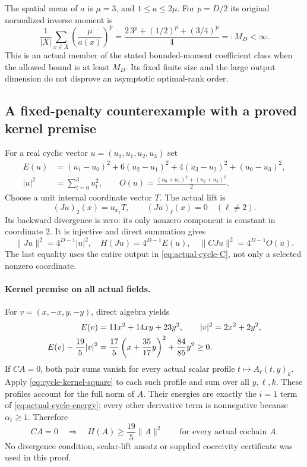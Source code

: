 The spatial mean of $a$ is $\mu=3$, and $1\leq a\leq2\mu$.
For $p=D/2$ its original normalized inverse moment is
\begin{equation}\label{eq:actual-cycle-moment}
 \frac1{|X|}\sum_{x\in X}\left(\frac{\mu}{a(x)}\right)^p
   =\frac{2\,3^p+(1/2)^p+(3/4)^p}{4}=:M_D<\infty.
\end{equation}
This is an actual member of the stated bounded-moment coefficient class
when the allowed bound is at least $M_D$. Its fixed finite size and the
large output dimension do not disprove an asymptotic optimal-rank order.

\subsection{A fixed-penalty counterexample with a proved kernel premise}
For a real cyclic vector $u=(u_0,u_1,u_2,u_3)$ set
\begin{align*}
 E(u)&=(u_1-u_0)^2+6(u_2-u_1)^2+4(u_3-u_2)^2+(u_0-u_3)^2,\\
 |u|^2&=\sum_{t=0}^3u_t^2,\qquad
 O(u)=\frac{(u_0+u_1)^2+(u_2+u_3)^2}{2}.
\end{align*}
Choose a unit internal coordinate vector $T$. The actual lift is
\[
 (Ju)_2(x)=u_{x_1}T,\qquad (Ju)_\ell(x)=0\quad(\ell\ne2).
\]
Its backward divergence is zero: its only nonzero component is constant
in coordinate $2$. It is injective and direct summation gives
\begin{equation}\label{eq:cycle-transports}
 \|Ju\|^2=4^{D-1}|u|^2,\quad H(Ju)=4^{D-1}E(u),\quad
 \|CJu\|^2=4^{D-1}O(u).
\end{equation}
The last equality uses the entire output in \eqref{eq:actual-cycle-C},
not only a selected nonzero coordinate.

\paragraph{Kernel premise on all actual fields.}
For $v=(x,-x,y,-y)$, direct algebra yields
\begin{align}
 E(v)&=11x^2+14xy+23y^2,\qquad |v|^2=2x^2+2y^2,\notag\\
 E(v)-\frac{19}{5}|v|^2
   &=\frac{17}{5}\left(x+\frac{35}{17}y\right)^2
       +\frac{84}{85}y^2\geq0.\label{eq:cycle-kernel-square}
\end{align}
If $CA=0$, both pair sums vanish for every actual scalar profile
$t\mapsto A_\ell(t,y)_k$. Apply \eqref{eq:cycle-kernel-square}
to each such profile and sum over all $y,\ell,k$. These profiles account
for the full norm of $A$. Their energies are exactly the $i=1$ term
of \eqref{eq:actual-cycle-energy}; every other derivative term is
nonnegative because $\alpha_t\geq1$. Therefore
\begin{equation}\label{eq:full-physical-kernel}
 CA=0\quad\Longrightarrow\quad H(A)\geq\frac{19}{5}\|A\|^2
 \qquad\text{for every actual cochain }A.
\end{equation}
No divergence condition, scalar-lift ansatz or supplied coercivity
certificate was used in this proof.

